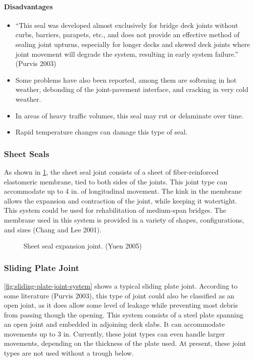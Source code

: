 \paragraph{Disadvantages}
\begin{itemize}
  \item “This seal was developed almost exclusively for bridge deck joints without curbs, barriers, parapets, etc., and does not provide an effective method of sealing joint upturns, especially for longer decks and skewed deck
  joints where joint movement will degrade the system, resulting in early system failure.” (Purvis 2003)
  \item Some problems have also been reported, among them are softening in hot weather, debonding of the joint-pavement interface, and cracking in very cold weather.  
  \item In areas of heavy traffic volumes, this seal may rut or delaminate over time.
  \item Rapid temperature changes can damage this type of seal.
\end{itemize}

\subsubsection{Sheet Seals}
As shown in \cref{fig:sheeet-seal-eapansion-joint}, the sheet seal joint consists of a sheet of fiber-reinforced elastomeric membrane, tied to
both sides of the joints. This joint type can accommodate up to 4 in. of longitudinal movement. The kink in the
membrane allows the expansion and contraction of the joint, while keeping it watertight. This system could be used
for rehabilitation of medium-span bridges. The membrane used in this system is provided in a variety of shapes,
configurations, and sizes (Chang and Lee 2001).

\begin{figure}
  \caption{Sheet seal expansion joint. (Yuen 2005)}
  \label{fig:sheeet-seal-eapansion-joint}
\end{figure}

\subsubsection{Sliding Plate Joint}
\cref{fig:sliding-plate-joint-system} shows a typical sliding plate joint. According to some literature (Purvis 2003), this type of joint could
also be classified as an open joint, as it does allow some level of leakage while preventing most debris from passing though the opening. This system consists of a steel plate spanning an open joint and embedded in adjoining deck
slabs. It can accommodate movements up to 3 in. Currently, these joint types can even handle larger movements,
depending on the thickness of the plate used. At present, these joint types are not used without a trough below.

